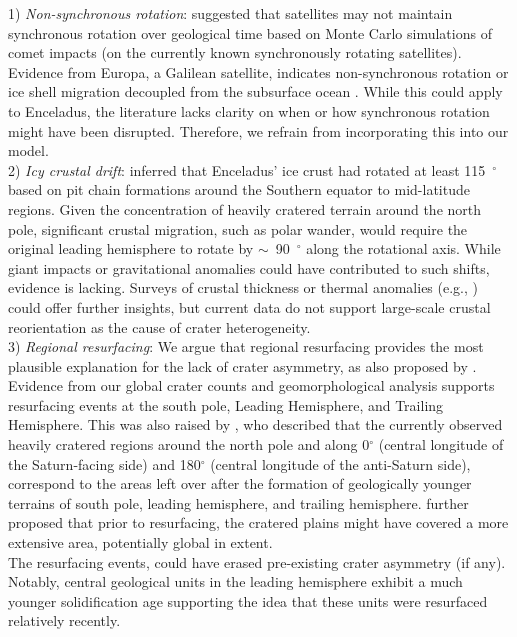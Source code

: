 \documentclass[preprint,12pt,3p,times,authoryear]{elsarticle}
\begin{document}
1) \textit{Non-synchronous rotation}: \citet{Zahnle2001} suggested that satellites may not maintain synchronous rotation over geological time based on Monte Carlo simulations of comet impacts (on the currently known synchronously rotating satellites). Evidence from Europa, a Galilean satellite, indicates non-synchronous rotation or ice shell migration decoupled from the subsurface ocean \citep{Kattenhorn2009,Collins2009}. While this could apply to Enceladus, the literature lacks clarity on when or how synchronous rotation might have been disrupted. Therefore, we refrain from incorporating this into our model.\\

2) \textit{Icy crustal drift}: \citet{Martin2014} inferred that Enceladus' ice crust had rotated at least 115~$^\circ$ based on pit chain formations around the Southern equator to mid-latitude regions. Given the concentration of heavily cratered terrain around the north pole, significant crustal migration, such as polar wander, would require the original leading hemisphere to rotate by $\sim$~90~$^\circ$ along the rotational axis. While giant impacts or gravitational anomalies could have contributed to such shifts, evidence is lacking. Surveys of crustal thickness or thermal anomalies (e.g., \citealt{Schenk2024}) could offer further insights, but current data do not support large-scale crustal reorientation as the cause of crater heterogeneity.\\

3) \textit{Regional resurfacing}: We argue that regional resurfacing provides the most plausible explanation for the lack of crater asymmetry, as also proposed by \citet{Zahnle2001}.
Evidence from our global crater counts and geomorphological analysis supports resurfacing events at the south pole, Leading Hemisphere, and Trailing Hemisphere. This was also raised by \citet{Patterson2018}, who described that the currently observed heavily cratered regions around the north pole and along 0$^\circ$ (central longitude of the Saturn-facing side) and 180$^\circ$ (central longitude of the anti-Saturn side), correspond to the areas left over after the formation of geologically younger terrains of south pole, leading hemisphere, and trailing hemisphere. \citet{Patterson2018} further proposed that prior to resurfacing, the cratered plains might have covered a more extensive area, potentially global in extent.\\

The resurfacing events, %
could have erased pre-existing crater asymmetry (if any).%
Notably, central geological units in the leading hemisphere exhibit a much younger solidification age%
supporting the idea that these units were resurfaced relatively recently.
\end{document}
